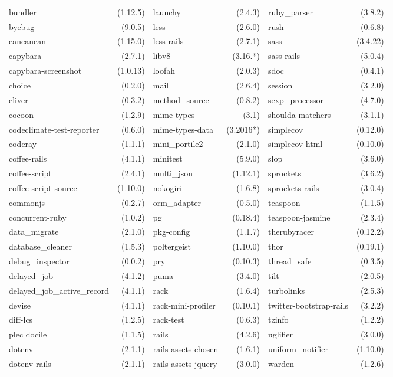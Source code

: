 \begin{table}[!h]
\begin{tabular}{|p{2.4cm}r||p{2.4cm}r||p{2.4cm}r|}
bundler&(1.12.5)&launchy&(2.4.3)&ruby\_parser&(3.8.2)\\
byebug&(9.0.5)&less&(2.6.0)&rush&(0.6.8)\\
cancancan&(1.15.0)&less-rails&(2.7.1)&sass&(3.4.22)\\
capybara&(2.7.1)&libv8&(3.16.*)&sass-rails&(5.0.4)\\
\tiny{capybara-screenshot}&(1.0.13)&loofah&(2.0.3)&sdoc&(0.4.1)\\
choice&(0.2.0)&mail&(2.6.4)&session&(3.2.0)\\
cliver&(0.3.2)&method\_source&(0.8.2)&sexp\_processor&(4.7.0)\\
cocoon&(1.2.9)&\tiny{mime-types}&(3.1)&\tiny{shoulda-matchers}&(3.1.1)\\
\tiny{codeclimate-test-reporter}&(0.6.0)&\tiny{mime-types-data}&(3.2016*)&simplecov&(0.12.0)\\
coderay&(1.1.1)&mini\_portile2&(2.1.0)&\tiny{simplecov-html}&(0.10.0)\\
coffee-rails&(4.1.1)&minitest&(5.9.0)&slop&(3.6.0)\\
coffee-script&(2.4.1)&multi\_json&(1.12.1)&sprockets&(3.6.2)\\
\tiny{coffee-script-source}&(1.10.0)&nokogiri&(1.6.8)&sprockets-rails&(3.0.4)\\
commonjs&(0.2.7)&orm\_adapter&(0.5.0)&teaspoon&(1.1.5)\\
\tiny{concurrent-ruby}&(1.0.2)&pg&(0.18.4)&\tiny{teaspoon-jasmine}&(2.3.4)\\
data\_migrate&(2.1.0)&pkg-config&(1.1.7)&therubyracer&(0.12.2)\\
\tiny{database\_cleaner}&(1.5.3)&poltergeist&(1.10.0)&thor&(0.19.1)\\
debug\_inspector&(0.0.2)&pry&(0.10.3)&thread\_safe&(0.3.5)\\
delayed\_job&(4.1.2)&puma&(3.4.0)&tilt&(2.0.5)\\
\tiny{delayed\_job\_active\_record}&(4.1.1)&rack&(1.6.4)&turbolinks&(2.5.3)\\
devise&(4.1.1)&\tiny{rack-mini-profiler}&(0.10.1)&\tiny{twitter-bootstrap-rails}&(3.2.2)\\
diff-lcs&(1.2.5)&rack-test&(0.6.3)&tzinfo&(1.2.2)\\plec
docile&(1.1.5)&rails&(4.2.6)&uglifier&(3.0.0)\\
dotenv&(2.1.1)&\tiny{rails-assets-chosen}&(1.6.1)&uniform\_notifier&(1.10.0)\\
dotenv-rails&(2.1.1)&\tiny{rails-assets-jquery}&(3.0.0)&warden&(1.2.6)\\

\end{tabular}
\end{table}
